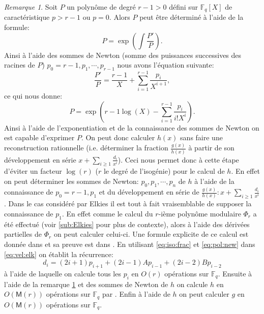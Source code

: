 \documentclass[10pt,a4paper]{book}
\theoremstyle{plain}
\theoremstyle{definition}
\theoremstyle{definition}
\theoremstyle{definition}
\theoremstyle{definition}
\theoremstyle{definition}
\theoremstyle{remark}
\newtheorem{rem}[thm]{Remarque}
\theoremstyle{remark}
\theoremstyle{definition}
\begin{document}
\begin{rem}
\label{rem:pol:rec}
Soit $P$ un polynôme de degré $r-1>0$ défini sur $\mathbb{F}_q[X]$ de caractéristique $p>r-1$ ou $p=0$. Alors $P$ peut être déterminé à l'aide de la formule:
\begin{equation}
P=\exp\left(\int{\frac{P'}{P}}\right).
\end{equation} 
Ainsi à l'aide des sommes de Newton (somme des puissances successives des racines de $P$) $p_0=r-1,p_1, \cdots, p_{r-1}$ nous avons l'équation suivante:
\begin{equation}
\label{eq:pol:new}
\frac{P'}{P}= \frac{r-1}{X} + \sum_{i = 1}^{r-1} \frac{p_i}{X^{i+1}},
\end{equation}
ce qui nous donne:
\begin{equation}
P=\exp\left( r-1 \log(X) - \sum_{i = 1}^{r-1} \frac{p_i}{i!X^i} \right).
\end{equation} 
Ainsi à l'aide de l'exponentiation et de la connaissance des sommes de Newton 
on est capable d'exprimer $P$.
On peut donc calculer $h(x)$ sans faire une reconstruction rationnelle (i.e. déterminer 
la fraction $\frac{g(x)}{h(x)}$ à partir de son développement en série 
$x+\sum_{i \geqslant 1}\frac{d_i}{x^i}$). Ceci nous permet donc à cette étape 
d'éviter un facteur $\log(r)$ ($r$ le degré de l'isogénie) pour le calcul de $h$. 
En effet on peut déterminer les sommes
de Newton: $p_0,p_1,\cdots, p_n$ de $h$ à l'aide de la connaissance de 
$p_0=r-1, p_1$ et du développement en série de $\frac{g(x)}{h(x)}:x+
\sum_{i \geqslant 1}\frac{d_i}{x^i}$.
Dans le cas considéré par Elkies il est tout à fait vraisemblable de supposer 
la connaissance de $p_1$. En effet comme le calcul du $r$-ième polynôme 
modulaire $\Phi_{r}$ a été effectué (voir \ref{sub:Elkies} pour plus de 
contexte), alors à l'aide des dérivées partielles de $\Phi_{r}$ on peut 
calculer celui-ci. Une formule explicite de ce calcul est donnée dans 
\cite[Theorem 17.22]{ehcc05} et sa preuve est dans \cite[§7]{Schoof95}. En 
utilisant \eqref{eq:iso:frac} et \eqref{eq:pol:new} dans \eqref{eq:vel:elk} on 
établit la récurrence:
\begin{equation}
\label{eq:p:rec}
d_i=(2i+1)p_{i+1}+(2i-1)Ap_{i-1}+(2i-2)Bp_{i-2}
\end{equation}
à l'aide de laquelle on calcule tous les $p_i$ en $O(r)$ opérations sur 
$\mathbb{F}_q$. Ensuite à l'aide de la remarque \ref{rem:pol:rec} et des sommes
de Newton de $h$ on calcule $h$ en $O(\mathsf{M}(r))$ opérations sur 
$\mathbb{F}_q$ par \cite[§2.2]{BMSS08}.
Enfin à l'aide de $h$ on peut calculer $g$ en $O(\mathsf{M}(r))$ opérations sur
$\mathbb{F}_q$.
\end{rem}
 
\end{document}
